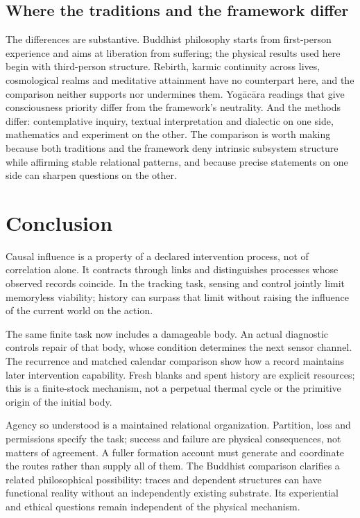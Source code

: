 \documentclass[11pt,a4paper]{article}
\begin{document}
\subsection{Where the traditions and the framework differ}

The differences are substantive. Buddhist philosophy starts from first-person experience and aims at liberation from suffering; the physical results used here begin with third-person structure. Rebirth, karmic continuity across lives, cosmological realms and meditative attainment have no counterpart here, and the comparison neither supports nor undermines them. Yog\=ac\=ara readings that give consciousness priority differ from the framework's neutrality. And the methods differ: contemplative inquiry, textual interpretation and dialectic on one side, mathematics and experiment on the other. The comparison is worth making because both traditions and the framework deny intrinsic subsystem structure while affirming stable relational patterns, and because precise statements on one side can sharpen questions on the other.

\section{Conclusion}
\label{sec:conclusion}

Causal influence is a property of a declared intervention process, not
of correlation alone. It contracts through links and distinguishes
processes whose observed records coincide. In the tracking task, sensing
and control jointly limit memoryless viability; history can surpass that
limit without raising the influence of the current world on the action.

The same finite task now includes a damageable body. An actual diagnostic
controls repair of that body, whose condition determines the next sensor
channel. The recurrence and matched calendar comparison show how a record
maintains later intervention capability. Fresh blanks and spent history
are explicit resources; this is a finite-stock mechanism, not a perpetual
thermal cycle or the primitive origin of the initial body.

Agency so understood is a maintained relational organization. Partition,
loss and permissions specify the task; success and failure are physical
consequences, not matters of agreement. A fuller formation account must
generate and coordinate the routes rather than supply all of them.
The Buddhist comparison clarifies a related philosophical possibility:
traces and dependent structures can have functional reality without an
independently existing substrate. Its experiential and ethical questions
remain independent of the physical mechanism.
\end{document}
